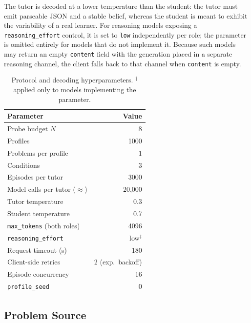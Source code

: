 The tutor is decoded at a lower temperature than the student: the tutor must
emit parseable JSON and a stable belief, whereas the student is meant to
exhibit the variability of a real learner. For reasoning models exposing a
\texttt{reasoning\_effort} control, it is set to \texttt{low} independently per
role; the parameter is omitted entirely for models that do not implement it.
Because such models may return an empty \texttt{content} field with the
generation placed in a separate reasoning channel, the client falls back to
that channel when \texttt{content} is empty.

\begin{table}[t]
\centering
\small
\begin{tabular}{@{}lr@{}}
\toprule
\textbf{Parameter} & \textbf{Value} \\
\midrule
Probe budget $N$                    & 8 \\
Profiles                            & 1000 \\
Problems per profile                & 1 \\
Conditions                          & 3 \\
Episodes per tutor                  & 3000 \\
Model calls per tutor ($\approx$)   & 20{,}000 \\
\midrule
Tutor temperature                   & 0.3 \\
Student temperature                 & 0.7 \\
\texttt{max\_tokens} (both roles)   & 4096 \\
\texttt{reasoning\_effort}          & low$^{\ddagger}$ \\
Request timeout (s)                 & 180 \\
Client-side retries                 & 2 (exp.\ backoff) \\
Episode concurrency                 & 16 \\
\texttt{profile\_seed}              & 0 \\
\bottomrule
\end{tabular}
\caption{Protocol and decoding hyperparameters. $^{\ddagger}$applied only to
models implementing the parameter.}
\label{tab:hparams}
\end{table}

\subsection{Problem Source}
\label{app:problems}

